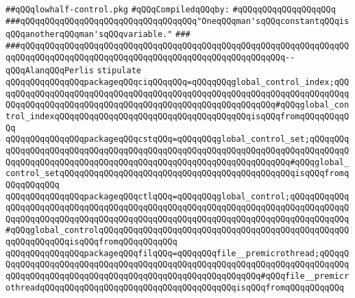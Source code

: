 \label{src/lib/compiler/back/low/control/lowhalf-control.pkg}
\verb|##qQQqlowhalf-control.pkg|\newline
\newline
\verb|#qQQqCompiledqQQqby:|\newline
\verb|#qQQqqQQqqQQqqQQqqQQq|\newline
\newline
\newline
\newline
\verb|###qQQqqQQqqQQqqQQqqQQqqQQqqQQqqQQqqQQq"OneqQQqman'sqQQqconstantqQQqisqQQqanotherqQQqman'sqQQqvariable."|\newline
\verb|###|\newline
\verb|###qQQqqQQqqQQqqQQqqQQqqQQqqQQqqQQqqQQqqQQqqQQqqQQqqQQqqQQqqQQqqQQqqQQqqQQqqQQqqQQqqQQqqQQqqQQqqQQqqQQqqQQqqQQqqQQqqQQqqQQqqQQq--qQQqAlanqQQqPerlis|\newline
\newline
\newline
\verb|stipulate|\newline
\verb|qQQqqQQqqQQqqQQqpackageqQQqciqQQqqQQq=qQQqqQQqglobal_control_index;qQQqqQQqqQQqqQQqqQQqqQQqqQQqqQQqqQQqqQQqqQQqqQQqqQQqqQQqqQQqqQQqqQQqqQQqqQQqqQQqqQQqqQQqqQQqqQQqqQQqqQQqqQQqqQQqqQQqqQQqqQQqqQQq#qQQqglobal_control_indexqQQqqQQqqQQqqQQqqQQqqQQqqQQqqQQqqQQqqQQqisqQQqfromqQQqqQQqqQQq|\newline
\verb|qQQqqQQqqQQqqQQqpackageqQQqcstqQQq=qQQqqQQqglobal_control_set;qQQqqQQqqQQqqQQqqQQqqQQqqQQqqQQqqQQqqQQqqQQqqQQqqQQqqQQqqQQqqQQqqQQqqQQqqQQqqQQqqQQqqQQqqQQqqQQqqQQqqQQqqQQqqQQqqQQqqQQqqQQqqQQqqQQqqQQq#qQQqglobal_control_setqQQqqQQqqQQqqQQqqQQqqQQqqQQqqQQqqQQqqQQqqQQqqQQqisqQQqfromqQQqqQQqqQQq|\newline
\verb|qQQqqQQqqQQqqQQqpackageqQQqctlqQQq=qQQqqQQqglobal_control;qQQqqQQqqQQqqQQqqQQqqQQqqQQqqQQqqQQqqQQqqQQqqQQqqQQqqQQqqQQqqQQqqQQqqQQqqQQqqQQqqQQqqQQqqQQqqQQqqQQqqQQqqQQqqQQqqQQqqQQqqQQqqQQqqQQqqQQqqQQqqQQqqQQqqQQq#qQQqglobal_controlqQQqqQQqqQQqqQQqqQQqqQQqqQQqqQQqqQQqqQQqqQQqqQQqqQQqqQQqqQQqqQQqisqQQqfromqQQqqQQqqQQq|\newline
\verb|qQQqqQQqqQQqqQQqpackageqQQqfilqQQq=qQQqqQQqfile__premicrothread;qQQqqQQqqQQqqQQqqQQqqQQqqQQqqQQqqQQqqQQqqQQqqQQqqQQqqQQqqQQqqQQqqQQqqQQqqQQqqQQqqQQqqQQqqQQqqQQqqQQqqQQqqQQqqQQqqQQqqQQqqQQqqQQq#qQQqfile__premicrothreadqQQqqQQqqQQqqQQqqQQqqQQqqQQqqQQqqQQqqQQqisqQQqfromqQQqqQQqqQQq|\newline
